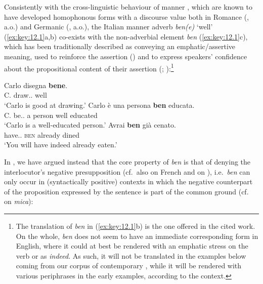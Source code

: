 \documentclass[output=paper]{langsci/langscibook}
\begin{document}
Consistently with the cross-linguistic behaviour of manner , which are
known to have developed  homophonous forms with a discourse value both in
Romance (\citealt{Belletti1990,Belletti1994,Lonzi1991,Cinque1976,Cinque1999,%
Vinet1996,WalDet2007,Coniglio2008,Hernanz2010,Cardinaletti2011,PadPen2014},
a.o.) and Germanic (\citealt{Weydt1969,Baardewyk-Resseguier1991}, a.o.), the
Italian manner adverb \emph{ben(e)} ‘well’ (\ref{ex:key:12.1}a,b) co-exists with the
non-adverbial element \emph{ben} (\ref{ex:key:12.1}c), which has been traditionally described
as conveying an em\-phat\-ic/as\-sertive meaning, used to
reinforce the assertion (\citealt{Belletti1990,Belletti1994,Lonzi1991}) and
to express speakers’ confidence about the propositional content of their
assertion (\citealt{Coniglio2008}; \citealt{Cardinaletti2011}):\footnote{The
    translation of \emph{ben} in (\ref{ex:key:12.1}b) is the one offered in the cited work. On
    the whole, \emph{ben} does not seem to have an immediate corresponding form
    in English, where it could at best be rendered with an emphatic stress on
    the verb or as \emph{indeed}. As such, it will not be translated in the
examples below coming from our corpus of contemporary , while it will be
rendered with various periphrases in the early examples, according to the
context.}

\ea\label{ex:key:12.1}  \parencite[171, fn.\ 20]{Cinque1999}
	\ea
		\gll    Carlo disegna \textbf{bene}.\\
			    C.  draw.\Prs{}.\Tsg{}  well\\
        \glt    \enquote*{Carlo is good at drawing.}
	\ex
		\gll    Carlo è una persona \textbf{ben} educata.\\
			    C.  be.\Prs.\Tsg{} a person well  educated\\
        \glt    \enquote*{Carlo is a well-educated person.}
    \ex
		\gll    Avrai \textbf{ben} già cenato.\\
			    have.\Fut{}.\Ssg{} \textsc{ben} already dined\\
        \glt    \enquote*{You will have indeed already eaten.}
	\z
\z

In \textcite{CognSchi2018b,CognSchi2018}, we have argued instead that the core
property of  \emph{ben} is that of denying the interlocutor’s negative
presupposition (cf.\ also \citealt{WalDet2007} on French and
\citealt{Hernanz2010} on ), i.e.\ \emph{ben} can only occur in
(syntactically positive) contexts in which the negative counterpart of the
proposition expressed by the sentence is part of the common ground (cf.\
\citealt{Cinque1976} on \emph{mica}):
\end{document}
